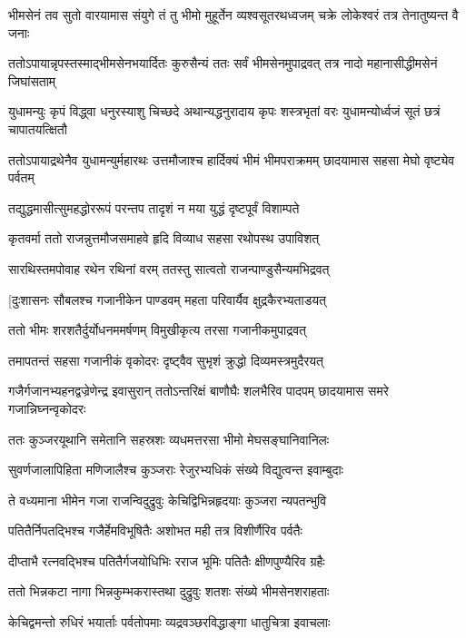 भीमसेनं तव सुतो वारयामास संयुगे
\twolineshloka
{तं तु भीमो मुहूर्तेन व्यश्वसूतरथध्वजम्}
{चक्रे लोकेश्वरं तत्र तेनातुष्यन्त वै जनाः}


\threelineshloka
{ततोऽपायान्नृपस्तस्माद्भीमसेनभयार्दितः}
{कुरुसैन्यं ततः सर्वं भीमसेनमुपाद्रवत्}
{तत्र नादो महानासीद्धीमसेनं जिघांसताम्}


\threelineshloka
{युधामन्युः कृपं विद्ध्वा धनुरस्याशु चिच्छदे}
{अथान्यद्धनुरादाय कृपः शस्त्रभृतां वरः}
{युधामन्योर्ध्वजं सूतं छत्रं चापातयत्क्षितौ}


ततोऽपायाद्रथेनैव युधामन्युर्महारथः
\twolineshloka
{उत्तमौजाश्च हार्दिक्यं भीमं भीमपराक्रमम्}
{छादयामास सहसा मेघो वृष्ट्येव पर्वतम्}


\twolineshloka
{तद्युद्धमासीत्सुमहद्धोररूपं परन्तप}
{तादृशं न मया युद्धं दृष्टपूर्वं विशाम्पते}


\twolineshloka
{कृतवर्मा ततो राजन्नुत्तमौजसमाहवे}
{हृदि विव्याध सहसा रथोपस्थ उपाविशत्}


\twolineshloka
{सारथिस्तमपोवाह रथेन रथिनां वरम्}
{ततस्तु सात्वतो राजन्पाण्डुसैन्यमभिद्रवत्}


\twolineshloka
{[दुःशासनः सौबलश्च गजानीकेन पाण्डवम्}
{महता परिवार्यैव क्षुद्रकैरभ्यताडयत्}


\twolineshloka
{ततो भीमः शरशतैर्दुर्योधनममर्षणम्}
{विमुखीकृत्य तरसा गजानीकमुपाद्रवत्}


\twolineshloka
{तमापतन्तं सहसा गजानीकं वृकोदरः}
{दृष्ट्वैव सुभृशं क्रुद्धो दिव्यमस्त्रमुदैरयत्}


गजैर्गजानभ्यहनद्वज्रेणेन्द्र इवासुरान्
\twolineshloka
{ततोऽन्तरिक्षं बाणौघैः शलभैरिव पादपम्}
{छादयामास समरे गजान्निघ्नन्वृकोदरः}


\twolineshloka
{ततः कुञ्जरयूथानि समेतानि सहस्रशः}
{व्यधमत्तरसा भीमो मेघसङ्घानिवानिलः}


\twolineshloka
{सुवर्णजालापिहिता मणिजालैश्च कुञ्जराः}
{रेजुरभ्यधिकं संख्ये विद्युत्वन्त इवाम्बुदाः}


\twolineshloka
{ते वध्यमाना भीमेन गजा राजन्विदुद्रुवुः}
{केचिद्विभिन्नहृदयाः कुञ्जरा न्यपतन्भुवि}


\twolineshloka
{पतितैर्निपतद्भिश्च गजैर्हेमविभूषितैः}
{अशोभत मही तत्र विशीर्णैरिव पर्वतैः}


\twolineshloka
{दीप्ताभै रत्नवद्भिश्च पतितैर्गजयोधिभिः}
{रराज भूमिः पतितैः क्षीणपुण्यैरिव ग्रहैः}


\twolineshloka
{ततो भिन्नकटा नागा भिन्नकुम्भकरास्तथा}
{दुद्रुवुः शतशः संख्ये भीमसेनशराहताः}


\twolineshloka
{केचिद्वमन्तो रुधिरं भयार्ताः पर्वतोपमाः}
{व्यद्रवञ्छरविद्धाङ्गा धातुचित्रा इवाचलाः}


